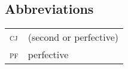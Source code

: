\documentclass[output=paper,
modfonts
]{LSP/langsci}
\begin{document}
\subsection*{Abbreviations}
\noindent\begin{tabular}{ll}
	    \textsc{cj} & (second or perfective) \isi{conjunctive}\\
	    \textsc{pf} & perfective
\end{tabular}

\nocite{unknown-a,unknown-b}

{\sloppy
\printbibliography[heading=subbibliography,notkeyword=this]
}
\end{document}
